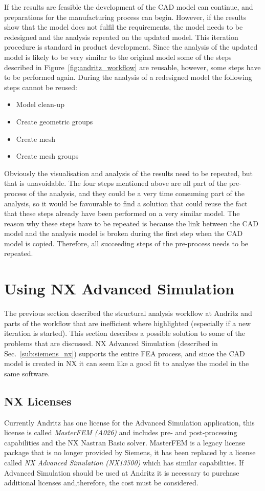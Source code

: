 If the results are feasible the development of the CAD model can continue, and preparations for the manufacturing process can begin. However, if the results show that the model does not fulfil the requirements, the model needs to be redesigned and the analysis repeated on the updated model. This iteration procedure is standard in product development. Since the analysis of the updated model is likely to be very similar to the original model some of the steps described in Figure~\ref{fig:andritz_workflow} are reusable, however, some steps have to be performed again. During the analysis of a redesigned model the following steps cannot be reused:
\begin{itemize}
	\item Model clean-up
	\item Create geometric groups
	\item Create mesh
	\item Create mesh groups
\end{itemize}
Obviously the visualisation and analysis of the results need to be repeated, but that is unavoidable. The four steps mentioned above are all part of the pre-process of the analysis, and they could be a very time consuming part of the analysis, so it would be favourable to find a solution that could reuse the fact that these steps already have been performed on a very similar model. The reason why these steps have to be repeated is because the link between the CAD model and the analysis model is broken during the first step when the CAD model is copied. Therefore, all succeeding steps of the pre-process needs to be repeated.

\section{Using NX Advanced Simulation} %
\label{sec:using_nx_advanced_simulation}
The previous section described the structural analysis workflow at Andritz and parts of the workflow that are inefficient where highlighted (especially if a new iteration is started). This section describes a possible solution to some of the problems that are discussed. NX Advanced Simulation (described in Sec.~\ref{sub:siemens_nx}) supports the entire FEA process, and since the CAD model is created in NX it can seem like a good fit to analyse the model in the same software.

\subsection{NX Licenses} %
\label{sub:nx_licenses}
Currently Andritz has one license for the Advanced Simulation application, this license is called \textit{MasterFEM (A026)} and includes pre- and post-processing capabilities and the NX Nastran Basic solver. MasterFEM is a legacy license package that is no longer provided by Siemens, it has been replaced by a license called \textit{NX Advanced Simulation (NX13500)} which has similar capabilities. If Advanced Simulation should be used at Andritz it is necessary to purchase additional licenses and,therefore, the cost must be considered.

